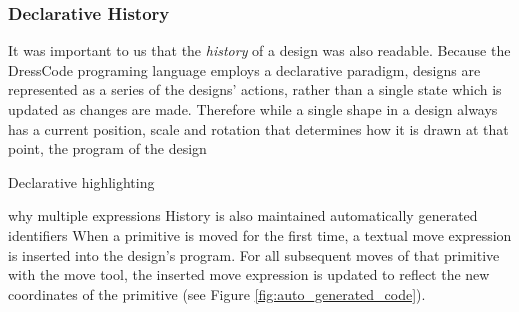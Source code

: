 \documentclass{sigchi}
\begin{document}
\subsubsection{Declarative History}
It was important to us that the \textit{history} of a design was also readable. Because the DressCode programing language employs a declarative paradigm, designs are represented as a series of the designs' actions, rather than a single state which is updated as changes are made. Therefore while a single shape in a design always has a current position, scale and rotation that determines how it is drawn at that point, the program of the design 


Declarative highlighting


why multiple expressions
History is also maintained
automatically generated identifiers
When a primitive is moved for the first time, a textual move expression is inserted into the design's program. For all subsequent moves of that primitive with the move tool, the inserted move expression is updated to reflect the new coordinates of the primitive (see Figure \ref{fig:auto_generated_code}).

\end{document}
